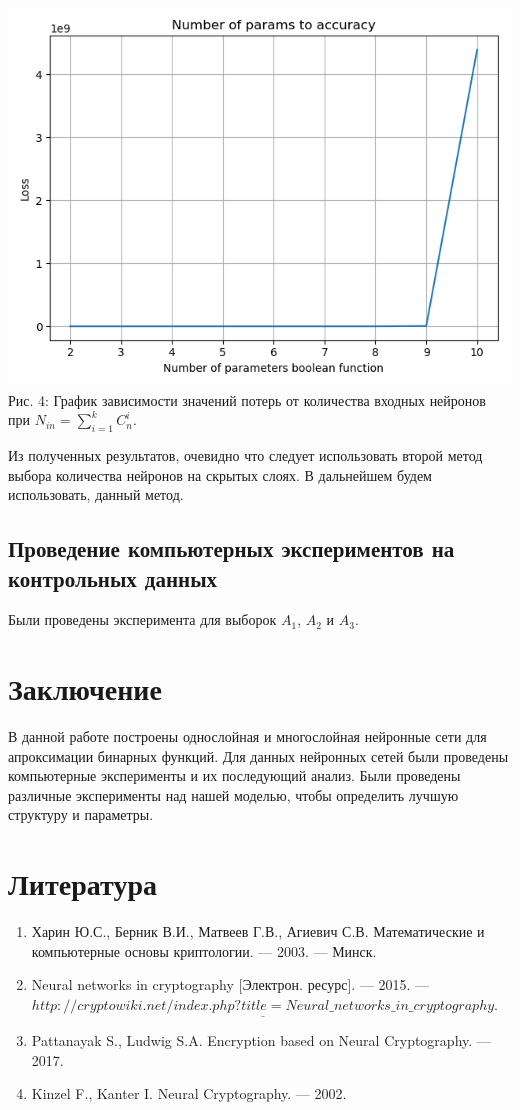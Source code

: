 \documentclass[a4paper,12pt,twoside]{article}
\begin{document}
	\includegraphics[width=\linewidth]{Loss_params_teta.png}
	Рис. 4: График зависимости значений потерь от количества входных нейронов при $N_{in} = \sum_{i=1}^k C_n^i$.

	Из полученных результатов, очевидно что следует использовать второй метод выбора количества нейронов на скрытых слоях. В дальнейшем будем использовать, данный метод.
	
	\subsection{Проведение компьютерных экспериментов на контрольных данных}
	Были проведены эксперимента для выборок $A_1$, $A_2$ и $A_3$.
	 
	
	\newpage	
	\section{Заключение}
	\bigskip
	В данной работе построены однослойная и многослойная нейронные сети для апроксимации бинарных функций. Для данных нейронных сетей были проведены компьютерные эксперименты и их последующий анализ. Были проведены различные эксперименты над нашей моделью, чтобы определить лучшую структуру и параметры.

	\newpage	
	\section*{Литература}
	\bigskip
	\begin{enumerate}
		\item Харин Ю.С., Берник В.И., Матвеев Г.В., Агиевич С.В. Математические и компьютерные основы криптологии. — 2003. — Минск.
		\item Neural networks in cryptography [Электрон. ресурс]. — 2015. — \\
		$\underline{http://cryptowiki.net/index.php?title=Neural\_networks\_in\_cryptography}$.
		\item Pattanayak S., Ludwig S.A. Encryption based on Neural Cryptography. — 2017.
		\item Kinzel F., Kanter I. Neural Cryptography. — 2002.
	\end{enumerate}
	
\end{document}
